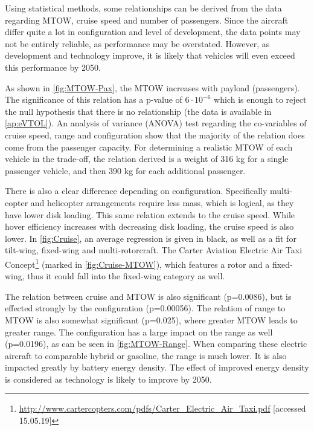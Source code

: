 Using statistical methods, some relationships can be derived from the data regarding MTOW, cruise speed and number of passengers. Since the aircraft differ quite a lot in configuration and level of development, the data points may not be entirely reliable, as performance may be overstated. However, as development and technology improve, it is likely that vehicles will even exceed this performance by 2050.

As shown in \autoref{fig:MTOW-Pax}, the MTOW increases with payload (passengers). The significance of this relation has a p-value of $6\cdot10^{-6}$ which is enough to reject the null hypothesis that there is no relationship (the data is available in \autoref{ap:eVTOL}). An analysis of variance (ANOVA) test regarding the co-variables of cruise speed, range and configuration show that the majority of the relation does come from the passenger capacity. For determining a realistic MTOW of each vehicle in the trade-off, the relation derived is a weight of 316 kg for a single passenger vehicle, and then 390 kg for each additional passenger.

There is also a clear difference depending on configuration. Specifically multi-copter and helicopter  arrangements require less mass, which is logical, as they have lower disk loading. This same relation extends to the cruise speed. While hover efficiency increases with decreasing disk loading, the cruise speed is also lower. In \autoref{fig:Cruise}, an average regression is given in black, as well as a fit for tilt-wing, fixed-wing and multi-rotorcraft. %
The Carter Aviation Electric Air Taxi Concept\footnote{\url{http://www.cartercopters.com/pdfs/Carter_Electric_Air_Taxi.pdf} [accessed 15.05.19]} (marked in \autoref{fig:Cruise-MTOW}), which features a rotor and a fixed-wing, thus it could fall into the fixed-wing category as well.

The relation between cruise and MTOW is also significant (p=0.0086), but is effected strongly by the configuration (p=0.00056). The relation of range to MTOW is also somewhat significant (p=0.025), where greater MTOW leads to greater range. The configuration has a large impact on the range as well (p=0.0196), as can be seen in \autoref{fig:MTOW-Range}. When comparing these electric aircraft to comparable hybrid or gasoline, the range is much lower. It is also impacted greatly by battery energy density. The effect of improved energy density is considered as technology is likely to improve by 2050.

